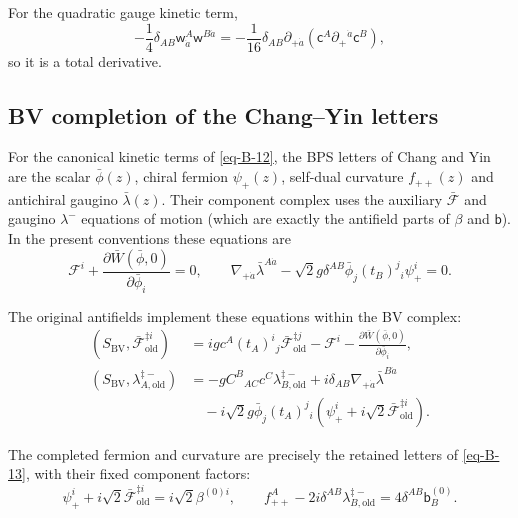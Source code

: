 \documentclass[11pt]{article}
\numberwithin{equation}{section}
\numberwithin{figure}{section}
\numberwithin{table}{section}
\begin{document}
For the quadratic gauge kinetic term,
\begin{equation}\label{b-00931}
-\frac14\delta_{AB}\mathsf w_{\dot a}^A\mathsf w^{B\dot a}
=-\frac1{16}\delta_{AB}\partial_{+\dot a}
  (\mathsf c^A\partial_+{}^{\dot a}\mathsf c^B),
\end{equation}
so it is a total derivative.

\subsection{BV completion of the Chang--Yin letters}\label{bv-completion-of-the-changyin-letters}

For the canonical kinetic terms of \eqref{eq-B-12}, the BPS letters of Chang and Yin \cite[Section 2]{ChangYin} are the scalar $\bar\phi(z)$, chiral fermion $\psi_+(z)$, self-dual curvature $f_{++}(z)$ and antichiral gaugino $\bar\lambda(z)$. Their component complex uses the auxiliary $\bar{\mathcal F}$ and gaugino $\lambda^{-}$ equations of motion (which are exactly the antifield parts of $\beta$ and $\mathsf b$). In the present conventions these equations are
\begin{equation}\label{eq-CY-component-equations}
\mathcal F^i+\frac{\partial\bar W(\bar\phi,0)}{\partial\bar\phi_i}=0,
\qquad
\nabla_{+\dot a}\bar\lambda^{A\dot a}
-\sqrt2g\delta^{AB}\bar\phi_j(t_B)^j{}_i\psi_+^i=0.
\end{equation}

The original antifields implement these equations within the BV complex:
\begin{equation}\label{eq-CY-antifield-equations}
\begin{aligned}
(S_{\mathrm{BV}},\bar{\mathcal F}_{\mathrm{old}}^{\ddagger i})
&=igc^A(t_A)^i{}_j\bar{\mathcal F}_{\mathrm{old}}^{\ddagger j}
-\mathcal F^i-\frac{\partial\bar W(\bar\phi,0)}{\partial\bar\phi_i},\\
(S_{\mathrm{BV}},\lambda_{A,\mathrm{old}}^{\ddagger-})
&=-gC^B{}_{AC}c^C\lambda_{B,\mathrm{old}}^{\ddagger-}
+i\delta_{AB}\nabla_{+\dot a}\bar\lambda^{B\dot a}\\
&\quad-i\sqrt2g\bar\phi_j(t_A)^j{}_i
 \left(\psi_+^i+i\sqrt2\bar{\mathcal F}_{\mathrm{old}}^{\ddagger i}\right).
\end{aligned}
\end{equation}

The completed fermion and curvature are precisely the retained letters of \eqref{eq-B-13}, with their fixed component factors:
\begin{equation}\label{eq-CY-completed-letters}
\psi_+^i+i\sqrt2\bar{\mathcal F}_{\mathrm{old}}^{\ddagger i}
=i\sqrt2\beta^{(0)i},\qquad
f_{++}^A-2i\delta^{AB}\lambda_{B,\mathrm{old}}^{\ddagger-}
=4\delta^{AB}\mathsf b_B^{(0)}.
\end{equation}
\end{document}
